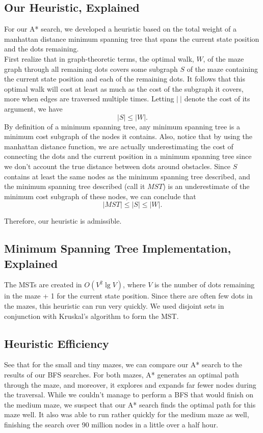 \documentclass[titlepage]{article}
\begin{document}
\newpage

\subsection*{Our Heuristic, Explained}
For our A* search, we developed a heuristic based on the total weight of a manhattan distance minimum spanning tree that spans the current state position and the dots remaining. \\

\noindent First realize that in graph-theoretic terms, the optimal walk, $W$, of the maze graph through all remaining dots covers some subgraph $S$ of the maze containing the current state position and each of the remaining dots. It follows that this optimal walk will cost at least as much as the cost of the subgraph it covers, more when edges are traversed multiple times. Letting $|\ |$ denote the cost of its argument, we have
$$|S| \le |W|.$$
\noindent By definition of a minimum spanning tree, any minimum spanning tree is a minimum cost subgraph of the nodes it contains. Also, notice that by using the manhattan distance function, we are actually underestimating the cost of connecting the dots and the current position in a minimum spanning tree since we don't account the true distance between dots around obstacles. Since $S$ contains at least the same nodes as the minimum spanning tree described, and the minimum spanning tree described (call it $MST$) is an underestimate of the minimum cost subgraph of these nodes, we can conclude that
$$|MST| \le |S| \le |W|.$$

\noindent Therefore, our heuristic is admissible. 

\subsection*{Minimum Spanning Tree Implementation, Explained}
The MSTs are created in $O(V^2 \lg V)$, where $V$ is the number of dots remaining in the maze + 1 for the current state position. Since there are often few dots in the mazes, this heuristic can run very quickly. We used disjoint sets in conjunction with Kruskal's algorithm to form the MST.


\subsection*{Heuristic Efficiency}
See that for the small and tiny mazes, we can compare our A* search to the results of our BFS searches. For both mazes, A* generates an optimal path through the maze, and moreover, it explores and expands far fewer nodes during the traversal. While we couldn't manage to perform a BFS that would finish on the medium maze, we suspect that our A* search finds the optimal path for this maze well. It also was able to run rather quickly for the medium maze as well, finishing the search over 90 million nodes in a little over a half hour.
\end{document}
